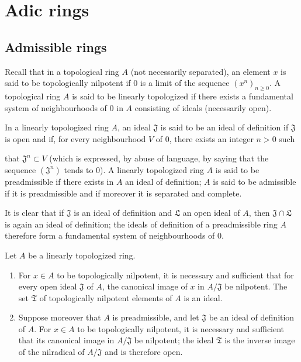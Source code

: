 \section{Adic rings}
\label{section:0.7}

\subsection{Admissible rings}
\label{subsection:0.7.1}

\begin{env}[7.1.1]
\label{0.7.1.1}
Recall that in a topological ring $A$ (not necessarily separated), an
element $x$ is said to be topologically nilpotent if $0$ is a limit of
the sequence $(x^n)_{n\geq0}$. A topological ring $A$ is said to be
linearly topologized if there exists a fundamental system of neighbourhoods of
$0$ in $A$ consisting of ideals (necessarily open).
\end{env}

\begin{definition}[7.1.2]
\label{0.7.1.2}
In a linearly topologized ring $A$, an ideal $\mathfrak J$ is said to be
an ideal of definition if $\mathfrak J$ is open and if, for every
neighbourhood $V$ of $0$, there exists an integer $n>0$ such


that $\mathfrak J^n\subset V$ (which is expressed, by abuse of language, by saying
that the sequence $(\mathfrak J^n)$ tends to $0$). A linearly
topologized ring $A$ is said to be preadmissible if there exists in $A$ an ideal of definition;
$A$ is said to be admissible if it is preadmissible and if moreover it is
separated and complete.
\end{definition}

It is clear that if $\mathfrak J$ is an ideal of definition and $\mathfrak L$ an
open ideal of $A$, then $\mathfrak J\cap\mathfrak L$ is again an ideal of
definition; the ideals of definition of a preadmissible ring $A$ therefore form
a fundamental system of neighbourhoods of $0$.

\begin{lemma}[7.1.3]
\label{0.7.1.3}
Let $A$ be a linearly topologized ring.
\begin{enumerate}
  \item[{\upshape(i)}] For $x\in A$ to be topologically nilpotent, it is
    necessary and sufficient that for every open ideal $\mathfrak J$ of $A$, the canonical
    image of $x$ in $A/\mathfrak J$ be nilpotent. The set
    $\mathfrak T$ of topologically nilpotent elements of $A$ is an ideal.
  \item[{\upshape(ii)}] Suppose moreover that $A$ is preadmissible, and let
    $\mathfrak J$ be an ideal of definition of $A$. For $x\in A$ to be
    topologically nilpotent, it is necessary and sufficient that its canonical image in
    $A/\mathfrak J$ be nilpotent; the ideal $\mathfrak T$ is the inverse
    image of the nilradical of $A/\mathfrak J$ and is therefore open.
\end{enumerate}
\end{lemma}

